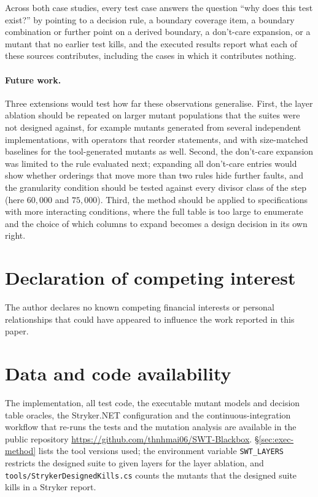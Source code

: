 \documentclass[11pt,a4paper]{article}
\begin{document}
Across both case studies, every test case answers the question ``why does
this test exist?'' by pointing to a decision rule, a boundary coverage item,
a boundary combination or further point on a derived boundary, a don't-care
expansion, or a mutant that no earlier test kills, and the executed
results report what each of these sources contributes, including the cases
in which it contributes nothing.

\paragraph{Future work.} Three extensions would test how far these
observations generalise. First, the layer ablation should be repeated on
larger mutant populations that the suites were not designed against, for
example mutants generated from several independent implementations, with
operators that reorder statements, and with size-matched baselines for the
tool-generated mutants as well. Second, the don't-care expansion was limited
to the rule evaluated next; expanding all don't-care entries would show
whether orderings that move more than two rules hide further faults, and the
granularity condition should be
tested against every divisor class of the step (here \(60{,}000\) and
\(75{,}000\)). Third, the method should be applied to specifications with
more interacting conditions, where the full table is too large to enumerate
and the choice of which columns to expand becomes a design decision in its
own right.

\section*{Declaration of competing interest}

The author declares no known competing financial interests or personal
relationships that could have appeared to influence the work reported in
this paper.

\section*{Data and code availability}

The implementation, all test code, the executable mutant models and decision
table oracles, the Stryker.NET configuration and the continuous-integration
workflow that re-runs the tests and the mutation analysis are available in
the public repository
\url{https://github.com/thnhmai06/SWT-Blackbox}.
\S\ref{sec:exec-method} lists the tool versions used; the environment
variable \texttt{SWT\_LAYERS} restricts the designed suite to given layers for
the layer ablation, and \texttt{tools/StrykerDesignedKills.cs} counts the
mutants that the designed suite kills in a Stryker report.
\end{document}
